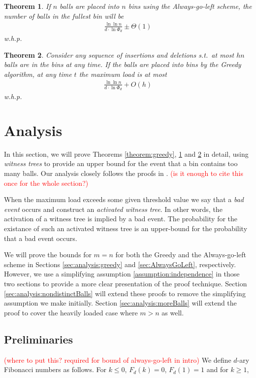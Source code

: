 \documentclass[a4paper,12pt]{article}
\newcommand\todo[1]{\textcolor{red}{(#1)}}
\newtheorem{theorem}{Theorem}
\begin{document}
\begin{theorem}
\label{theorem:agln}
If $n$ balls are placed into $n$ bins using the Always-go-left scheme, the number of balls in the fullest bin will be 
\begin{align}
\frac{\ln\ln n}{d \cdot \ln \Phi_d} \pm \Theta(1)
\end{align}
w.h.p.
\end{theorem}

\begin{theorem}
\label{theorem:algm}
Consider any sequence of insertions and deletions s.t.~at most $hn$ balls are in the bins at any time. If the balls are placed into bins by the Greedy algorithm, at any time $t$ the maximum load is at most 
\begin{align}
\frac{\ln\ln n}{d \cdot \ln \Phi_d} + O(h)
\end{align}
w.h.p.
\end{theorem}

\section{Analysis}
\label{sec:analysis}
In this section, we will prove Theorems \ref{theorem:greedy}, \ref{theorem:agln} and \ref{theorem:algm} in detail, using \emph{witness trees} to provide an upper bound for the event that a bin contains too many balls. Our analysis closely follows the proofs in \cite{VOC03}. \todo{is it enough to cite this once for the whole section?}

When the maximum load exceeds some given threshold value we say that a \emph{bad event} occurs and construct an \emph{activated witness tree}. In other words, the activation of a witness tree is implied by a bad event. The probability for the existance of such an activated witness tree is an upper-bound for the probability that a bad event occurs.

We will prove the bounds for $m=n$ for both the Greedy and the Always-go-left scheme in Sections \ref{sec:analysis:greedy} and \ref{sec:AlwaysGoLeft}, respectively. However, we use a simplifying assumption \ref{assumption:independence} in those two sections to provide a more clear presentation of the proof technique. Section \ref{sec:analysis:nondistinctBalls} will extend these proofs to remove the simplifying assumption we make initially. Section \ref{sec:analysis:moreBalls} will extend the proof to cover the heavily loaded case where $m > n$ as well.


\subsection{Preliminaries}
\label{sec:preliminaries}
\todo{where to put this? required for  bound of always-go-left in intro}
We define $d$-ary Fibonacci numbers as follows. For $k \leq0$, $F_d(k) = 0$, $F_d(1) = 1$ and for $k \geq 1$,
\end{document}
